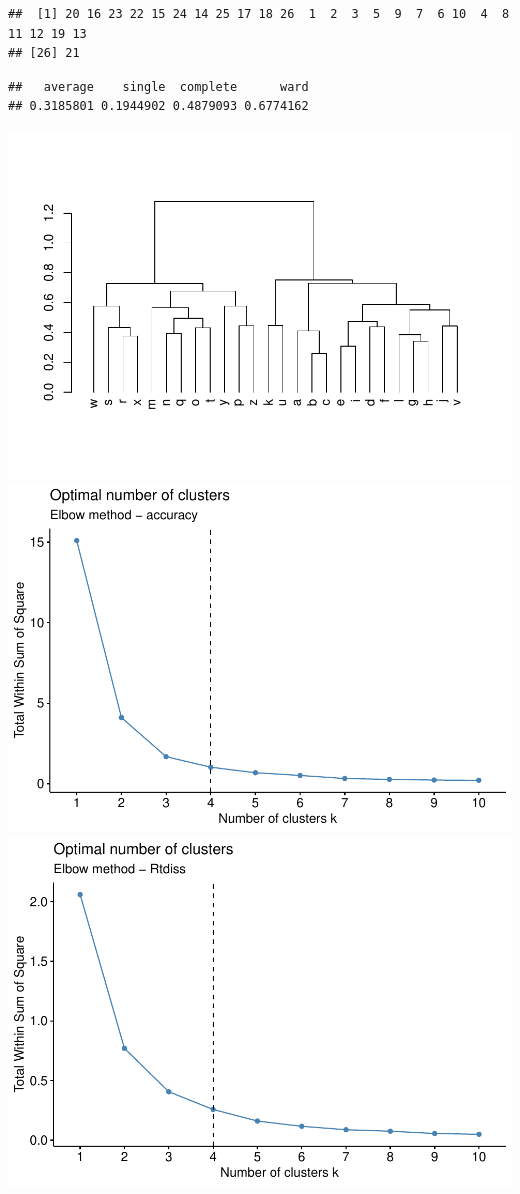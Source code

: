 \documentclass[
  english,
  man]{apa7}
\begin{document}
\begin{verbatim}
##  [1] 20 16 23 22 15 24 14 25 17 18 26  1  2  3  5  9  7  6 10  4  8 11 12 19 13
## [26] 21
\end{verbatim}

\begin{verbatim}
##   average    single  complete      ward 
## 0.3185801 0.1944902 0.4879093 0.6774162
\end{verbatim}

\includegraphics{BF_ms_1_files/figure-latex/Hierarchical clustering sighted-2.pdf} \includegraphics{BF_ms_1_files/figure-latex/Hierarchical clustering sighted-3.pdf} \includegraphics{BF_ms_1_files/figure-latex/Hierarchical clustering sighted-4.pdf}
\end{document}
